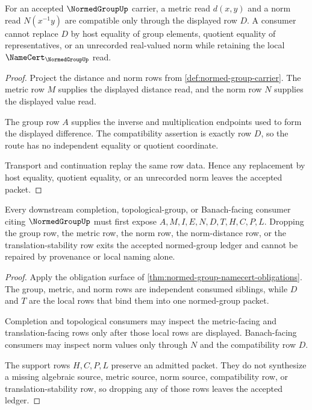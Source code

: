 \begin{theorem}
\label{thm:normed-group-norm-distance-compatibility}
For an accepted $\NormedGroupUp$ carrier, a metric read $d(x,y)$ and a norm read $N(x^{-1}y)$ are compatible only through the displayed row $D$. A consumer cannot replace $D$ by host equality of group elements, quotient equality of representatives, or an unrecorded real-valued norm while retaining the local $\NameCert_{\NormedGroupUp}$ read.
\end{theorem}
\begin{proof}
Project the distance and norm rows from \autoref{def:normed-group-carrier}. The metric row $M$ supplies the displayed distance read, and the norm row $N$ supplies the displayed value read.

The group row $A$ supplies the inverse and multiplication endpoints used to form the displayed difference. The compatibility assertion is exactly row $D$, so the route has no independent equality or quotient coordinate.

Transport and continuation replay the same row data. Hence any replacement by host equality, quotient equality, or an unrecorded norm leaves the accepted packet.
\end{proof}

\begin{theorem}
\label{thm:normed-group-ledger-nonescape}
Every downstream completion, topological-group, or Banach-facing consumer citing $\NormedGroupUp$ must first expose $A,M,I,E,N,D,T,H,C,P,L$. Dropping the group row, the metric row, the norm row, the norm-distance row, or the translation-stability row exits the accepted normed-group ledger and cannot be repaired by provenance or local naming alone.
\end{theorem}
\begin{proof}
Apply the obligation surface of \autoref{thm:normed-group-namecert-obligations}. The group, metric, and norm rows are independent consumed siblings, while $D$ and $T$ are the local rows that bind them into one normed-group packet.

Completion and topological consumers may inspect the metric-facing and translation-facing rows only after those local rows are displayed. Banach-facing consumers may inspect norm values only through $N$ and the compatibility row $D$.

The support rows $H,C,P,L$ preserve an admitted packet. They do not synthesize a missing algebraic source, metric source, norm source, compatibility row, or translation-stability row, so dropping any of those rows leaves the accepted ledger.
\end{proof}

